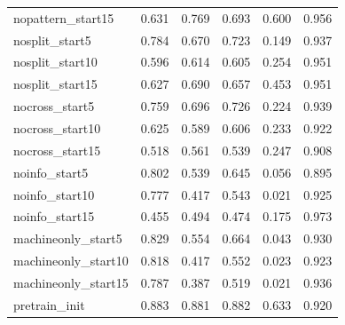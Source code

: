 \begin{table}[p]
\begin{tabularx}{\textwidth}{lXXXXX}
nopattern\_start15 & 0.631 & 0.769 & 0.693 & 0.600 & 0.956 \\
nosplit\_start5 & 0.784 & 0.670 & 0.723 & 0.149 & 0.937 \\
nosplit\_start10 & 0.596 & 0.614 & 0.605 & 0.254 & 0.951 \\
nosplit\_start15 & 0.627 & 0.690 & 0.657 & 0.453 & 0.951 \\
nocross\_start5 & 0.759 & 0.696 & 0.726 & 0.224 & 0.939 \\
nocross\_start10 & 0.625 & 0.589 & 0.606 & 0.233 & 0.922 \\
nocross\_start15 & 0.518 & 0.561 & 0.539 & 0.247 & 0.908 \\
noinfo\_start5 & 0.802 & 0.539 & 0.645 & 0.056 & 0.895 \\
noinfo\_start10 & 0.777 & 0.417 & 0.543 & 0.021 & 0.925 \\
noinfo\_start15 & 0.455 & 0.494 & 0.474 & 0.175 & 0.973 \\
machineonly\_start5 & 0.829 & 0.554 & 0.664 & 0.043 & 0.930 \\
machineonly\_start10 & 0.818 & 0.417 & 0.552 & 0.023 & 0.923 \\
machineonly\_start15 & 0.787 & 0.387 & 0.519 & 0.021 & 0.936 \\
pretrain\_init & 0.883 & 0.881 & 0.882 & 0.633 & 0.920 \\
\bottomrule
\end{tabularx}
\end{table}

